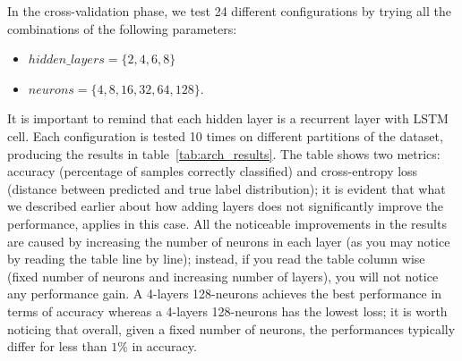 In the cross-validation phase, we test 24 different configurations by trying all the combinations of the following parameters:
\begin{itemize}
\item $hidden\_layers=\{2,4,6,8\}$
\item $neurons=\{4, 8,16,32,64,128\}$.
\end{itemize}
It is important to remind that each hidden layer is a recurrent layer with LSTM cell.
Each configuration is tested 10 times on different partitions of the dataset, producing the results in table~\ref{tab:arch_results}. The table shows two metrics: accuracy (percentage of samples correctly classified) and cross-entropy loss (distance between predicted and true label distribution); it is evident that what we described earlier about how adding layers does not significantly improve the performance, applies in this case. All the noticeable improvements in the results are caused by increasing the number of neurons in each layer (as you may notice by reading the table line by line); instead, if you read the table column wise (fixed number of neurons and increasing number of layers), you will not notice any performance gain. A 4-layers 128-neurons achieves the best performance in terms of accuracy whereas a 4-layers 128-neurons has the lowest loss; it is worth noticing that overall, given a fixed number of neurons, the performances typically differ for less than $1\%$ in accuracy. %
\begin{table}[]
\centering
{}
\caption{LSTM architectures comparison}
\label{tab:arch_results}
\end{table}


